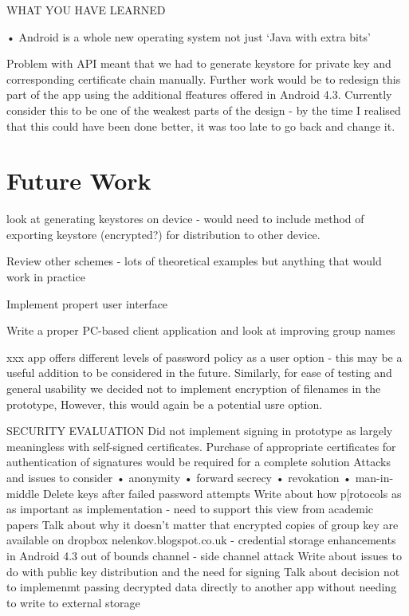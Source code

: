 WHAT YOU HAVE LEARNED

• Android is a whole new operating system not just ‘Java with extra bits’

Problem with API meant that we had to generate keystore for private key and corresponding certificate chain manually.  Further work would be to redesign this part of the app using the additional ffeatures offered in Android 4.3.  Currently consider this to be one of the weakest parts of the design - by the time I realised that this could have been done better, it was too late to go back and change it.
\section{Future Work}

look at generating keystores on device - would need to include method of exporting keystore (encrypted?) for distribution to other device.  

Review other schemes - lots of theoretical examples but anything that would work in practice

Implement propert user interface

Write a proper PC-based client application and look at improving group names

 xxx app offers different levels of password policy as a user option - this may be a useful addition to be considered in the future.   Similarly, for ease of testing and general usability we decided not to implement encryption of filenames in the prototype,  However, this would again be a potential usre option.


SECURITY EVALUATION
Did not implement signing in prototype as largely meaningless with self-signed certificates. Purchase of appropriate certificates for authentication of signatures would be required for a complete solution
Attacks and issues to consider
• anonymity
• forward secrecy
• revokation
• man-in-middle
Delete keys after failed password attempts
Write about how p[rotocols as as important as implementation - need to support this view from academic papers
Talk about why it doesn't matter that encrypted copies of group key are available on dropbox
nelenkov.blogspot.co.uk - credential storage enhancements in Android 4.3
out of bounds channel - side channel attack
Write about issues to do with public key distribution and the need for signing
Talk about decision not to implemenmt passing decrypted data directly to another app without needing to write to external storage








